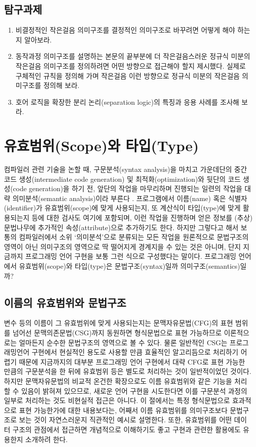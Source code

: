\section*{탐구과제}
\begin{enumerate}
 \item 비결정적인 작은걸음 의미구조를 결정적인 의미구조로 바꾸려면
       어떻게 해야 하는지 알아보라.
 \item 동작과정 의미구조를 설명하는 본문의 끝부분에 더 작은걸음스러운
       정규식 미분의 작은걸음 의미구조를 정의하려면 어떤 방향으로 접근해야
       할지 제시했다. 실제로 구체적인 규칙을 정의해 가며 작은걸음 이런
       방향으로 정규식 미분의 작은걸음 의미구조를 정의해 보라.
 \item 호어 로직을 확장한 분리 논리(separation logic)의 특징과 응용 사례를 조사해 보라.
\end{enumerate}

\chapter{유효범위(Scope)와 타입(Type)}
컴파일러 관련 기술을 논할 때, 구문분석(syntax analysis)을 마치고
가운데단의 중간 코드 생성(intermediate code generation) 및
최적화(optimization)와 뒷단의 코드 생성(code generation)을 하기 전,
앞단의 작업을 마무리하며 진행되는 일련의 작업을 대략
의미분석(semantic analysis)이라 부른다 \cite{Aho2013compilers2nd}.
프로그램에서 이름(name) 혹은 식별자(identifier)가 유효범위(scope)에
맞게 사용되는지, 또 계산식이 타입(type)에 맞게 활용되는지 등에 대한
검사도 여기에 포함되며, 이런 작업을 진행하며 얻은 정보를 (추상)문법나무에
추가적인 속성(attribute)으로 추가하기도 한다. 하지만 그렇다고 해서
보통의 컴파일러에서 소위 `의미분석'으로 분류되는 모든 작업을 원론적으로
문법구조의 영역이 아닌 의미구조의 영역으로 딱 떨어지게 경계지을 수 있는
것은 아니며, 단지 지금까지 프로그래밍 언어 구현을 보통 그런 식으로
구성했다는 말이다. 프로그래밍 언어에서 유효범위(scope)와 타입(type)은
문법구조(syntax)일까 의미구조(semantics)일까?

\newpage

\section{이름의 유효범위와 문법구조}
변수 등의 이름이 그 유효범위에 맞게 사용되는지는 문맥자유문법(CFG)의
표현 범위를 넘어선 문맥의존문법(CSG)까지 동원하면 형식문법으로 표현
가능하므로 이론적으로는 얼마든지 순수한 문법구조의 영역으로 볼 수 있다.
물론 일반적인 CSG는 프로그래밍언어 구현에서 현실적인 용도로 사용할 만큼
효율적인 알고리듬으로 처리하기 어렵기 때문에 지금까지의 대부분 프로그래밍
언어 구현에서 대략 CFG로 표현 가능한 만큼의 구문분석을 한 뒤에
유효범위 등은 별도로 처리하는 것이 일반적이었던 것이다. 하지만
문맥자유문법의 비교적 온건한 확장\cite{Okhotin2005existence}으로도
이름 유효범위와 같은 기능을 처리할 수 있음이 밝혀져 있으므로, 새로운
언어 구현을 시도한다면 이를 구문분석 과정의 일부로 처리하는 것도
비현실적 접근은 아니다. 이 절에서는 특정 형식문법으로 효과적으로
표현 가능한가에 대한 내용보다는, 어째서 이름 유효범위를 의미구조보다
문법구조로 보는 것이 자연스러운지 직관적인 예시로 설명한다. 또한,
유효범위를 어떤 데이터 구조의 관점에서 접근하면 개념적으로 이해하기도
좋고 구현과 관련한 활용에도 유용한지 소개하려 한다.

